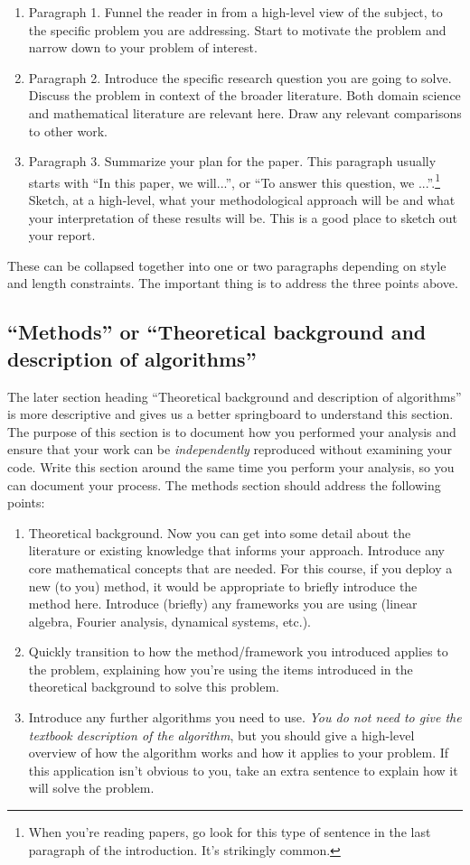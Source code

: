 \documentclass[]{article}
\begin{document}
\begin{enumerate}
    \item Paragraph 1. Funnel the reader in from a high-level view of the subject, to the specific problem you are addressing. Start to motivate the problem and narrow down to your problem of interest.
    \item Paragraph 2. Introduce the specific research question you are going to solve. Discuss the problem in context of the broader literature. Both domain science and mathematical literature are relevant here. Draw any relevant comparisons to other work.
    \item Paragraph 3. Summarize your plan for the paper. This paragraph usually starts with ``In this paper, we will...'', or ``To answer this question, we ...''.\footnote{When you're reading papers, go look for this type of sentence in the last paragraph of the introduction. It's strikingly common.}
          Sketch, at a high-level, what your methodological approach will be and what your interpretation of these results will be. This is a good place to sketch out your report.
\end{enumerate}
These can be collapsed together into one or two paragraphs depending on style and length constraints. The important thing is to address the three points above.

\subsection{``Methods'' or ``Theoretical background and description of algorithms''}

The later section heading ``Theoretical background and description of algorithms'' is more descriptive and gives us a better springboard to understand this section. The purpose of this section is to document how you performed your analysis and ensure that your work can be \emph{independently} reproduced without examining your code. Write this section around the same time you perform your analysis, so you can document your process. The methods section should address the following points:
\begin{enumerate}
    \item Theoretical background. Now you can get into some detail about the literature or existing knowledge that informs your approach. Introduce any core mathematical concepts that are needed. For this course, if you deploy a new (to you) method, it would be appropriate to briefly introduce the method here. Introduce (briefly) any frameworks you are using (linear algebra, Fourier analysis, dynamical systems, etc.).
    \item Quickly transition to how the method/framework you introduced applies to the problem, explaining how you're using the items introduced in the theoretical background to solve this problem.
    \item Introduce any further algorithms you need to use. \emph{You do not need to give the textbook description of the algorithm}, but you should give a high-level overview of how the algorithm works and how it applies to your problem. If this application isn't obvious to you, take an extra sentence to explain how it will solve the problem.
\end{enumerate}
\end{document}
